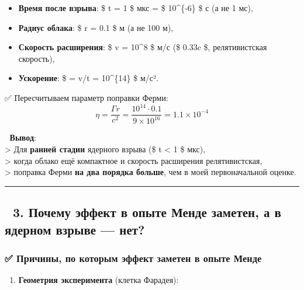 \documentclass[11pt]{article}
\providecommand{\tightlist}{%
      \setlength{\itemsep}{0pt}\setlength{\parskip}{0pt}}
\begin{document}
\begin{itemize}
\tightlist
\item
  \textbf{Время после взрыва}: \$ t = 1 \$ мкс = \$ 10\^{}\{-6\} \$ с (а
  не 1 мс),
\item
  \textbf{Радиус облака}: \$ r = 0.1 \$ м (а не 100 м),
\item
  \textbf{Скорость расширения}: \$ v = 10\^{}8 \$ м/с (\$ 0.33c \$,
  релятивистская скорость),
\item
  \textbf{Ускорение}: \$ \Gamma = v/t = 10\^{}\{14\} \$ м/с².
\end{itemize}

✅ Пересчитываем параметр поправки Ферми: \[
\eta = \frac{\Gamma r}{c^2} = \frac{10^{14} \cdot 0.1}{9 \times 10^{16}} = 1.1 \times 10^{-4}
\]

📌 \textbf{Вывод}:\\
\textgreater{} Для \textbf{ранней стадии} ядерного взрыва (\$ t
\textless{} 1 \$ мкс),\\
\textgreater{} когда облако ещё компактное и скорость расширения
релятивистская,\\
\textgreater{} поправка Ферми \textbf{на два порядка больше}, чем в моей
первоначальной оценке.

\begin{center}\rule{0.5\linewidth}{\linethickness}\end{center}

\subsection{🔹 3. Почему эффект в опыте Менде заметен, а в ядерном взрыве
---
нет?}\label{ux43fux43eux447ux435ux43cux443-ux44dux444ux444ux435ux43aux442-ux432-ux43eux43fux44bux442ux435-ux43cux435ux43dux434ux435-ux437ux430ux43cux435ux442ux435ux43d-ux430-ux432-ux44fux434ux435ux440ux43dux43eux43c-ux432ux437ux440ux44bux432ux435-ux43dux435ux442}

\subsubsection{✅ Причины, по которым эффект заметен в опыте
Менде}\label{ux43fux440ux438ux447ux438ux43dux44b-ux43fux43e-ux43aux43eux442ux43eux440ux44bux43c-ux44dux444ux444ux435ux43aux442-ux437ux430ux43cux435ux442ux435ux43d-ux432-ux43eux43fux44bux442ux435-ux43cux435ux43dux434ux435}

\begin{enumerate}
\def\labelenumi{\arabic{enumi}.}
\tightlist
\item
  \textbf{Геометрия эксперимента} (клетка Фарадея):\\
\end{enumerate}
\end{document}
